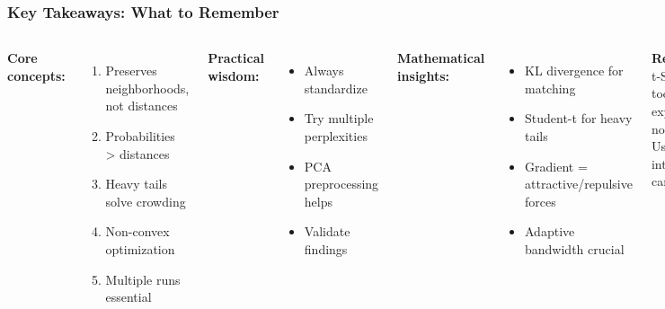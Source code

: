 \documentclass[aspectratio=169]{beamer}
\begin{document}
\begin{frame}
\frametitle{Key Takeaways: What to Remember}
\begin{columns}[T]
\textbf{Core concepts:}
\begin{enumerate}
\small
\item Preserves neighborhoods, not distances
\item Probabilities > distances
\item Heavy tails solve crowding
\item Non-convex optimization
\item Multiple runs essential
\end{enumerate}

\vspace{0.3cm}
\textbf{Practical wisdom:}
\begin{itemize}
\small
\item Always standardize
\item Try multiple perplexities
\item PCA preprocessing helps
\item Validate findings
\end{itemize}

\textbf{Mathematical insights:}
\begin{itemize}
\small
\item KL divergence for matching
\item Student-t for heavy tails
\item Gradient = attractive/repulsive forces
\item Adaptive bandwidth crucial
\end{itemize}

\vspace{0.3cm}
\textbf{Remember:}\\
\small t-SNE is a tool for exploration,\\
not proof!\\
\vspace{0.3cm}
Use wisely, interpret carefully
\end{columns}
\end{frame}
\end{document}
